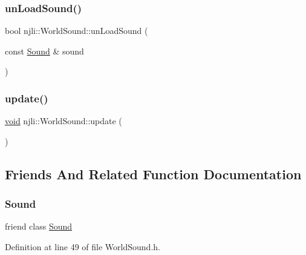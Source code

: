 \subsubsection{\texorpdfstring{un\+Load\+Sound()}{unLoadSound()}}
{\footnotesize\ttfamily bool njli\+::\+World\+Sound\+::un\+Load\+Sound (\begin{DoxyParamCaption}\item[{const \mbox{\hyperlink{classnjli_1_1_sound}{Sound}} \&}]{sound }\end{DoxyParamCaption})}

\mbox{\label{classnjli_1_1_world_sound_a30ef05c01a98642bb0b86f77c86a46b8}} 
\subsubsection{\texorpdfstring{update()}{update()}}
{\footnotesize\ttfamily \mbox{\hyperlink{_thread_8h_af1e856da2e658414cb2456cb6f7ebc66}{void}} njli\+::\+World\+Sound\+::update (\begin{DoxyParamCaption}{ }\end{DoxyParamCaption})\hspace{0.3cm}{\ttfamily [protected]}}



\subsection{Friends And Related Function Documentation}
\mbox{\label{classnjli_1_1_world_sound_a50914f77c7cf4fb97616c898c5291f4b}} 
\subsubsection{\texorpdfstring{Sound}{Sound}}
{\footnotesize\ttfamily friend class \mbox{\hyperlink{classnjli_1_1_sound}{Sound}}\hspace{0.3cm}{\ttfamily [friend]}}



Definition at line 49 of file World\+Sound.\+h.

\mbox{\label{classnjli_1_1_world_sound_a7b4bcdf992c21ae83363f25df05b1d25}} 
